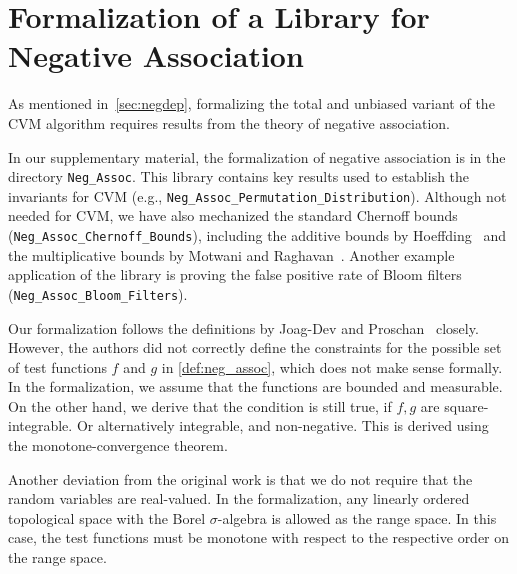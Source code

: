 \section{Formalization of a Library for Negative Association}\label{sec:formalization_neg_dep}
As mentioned in~\cref{sec:negdep}, formalizing the total and unbiased variant of the CVM algorithm requires results from the theory of negative association.

\begin{note}
In our supplementary material, the formalization of negative association is in the directory \verb|Neg_Assoc|.
This library contains key results used to establish the invariants for CVM (e.g., \verb|Neg_Assoc_Permutation_Distribution|).
Although not needed for CVM, we have also mechanized the standard Chernoff bounds (\verb|Neg_Assoc_Chernoff_Bounds|), including the additive bounds by Hoeffding~\cite[Th. 1, 2]{hoeffding1963} and the multiplicative bounds by Motwani and Raghavan~\cite[Th. 4.1, 4.2]{motwani1995}.
Another example application of the library is proving the false positive rate of Bloom filters (\verb|Neg_Assoc_Bloom_Filters|).
\lipicsEnd\end{note}

Our formalization follows the definitions by Joag-Dev and Proschan~\cite{joagdev1983} closely.
However, the authors did not correctly define the constraints for the possible set of test functions $f$ and $g$ in \cref{def:neg_assoc}, which does not make sense formally.
In the formalization, we assume that the functions are bounded and measurable.
On the other hand, we derive that the condition is still true, if $f, g$ are square-integrable.
Or alternatively integrable, and non-negative.
This is derived using the monotone-convergence theorem.

Another deviation from the original work is that we do not require that the random variables are real-valued.
In the formalization, any linearly ordered topological space with the Borel $\sigma$-algebra is allowed as the range space.
In this case, the test functions must be monotone with respect to the respective order on the range space.

